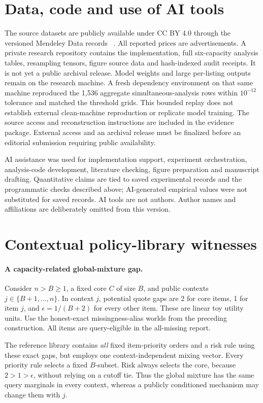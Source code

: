 \documentclass[11pt]{article}
\begin{document}
\section*{Data, code and use of AI tools}
The source datasets are publicly available under CC BY 4.0 through the
versioned Mendeley Data records ~\cite{jucarsdata,mucarsdata}. All reported
prices are advertisements. A private research repository contains the
implementation, full six-capacity analysis tables, resampling tensors, figure
source data and hash-indexed audit receipts. It is not yet a public archival
release. Model weights and large per-listing outputs remain on the research
machine. A fresh dependency environment on that same machine reproduced the 1,536 aggregate simultaneous-analysis rows within $10^{-12}$ tolerance and matched the threshold grids. This bounded replay does not establish external clean-machine reproduction or replicate model training.
The source access and reconstruction instructions are included in the evidence
package. External access and an archival release must be finalized before an
editorial submission requiring public availability.

AI assistance was used for implementation support, experiment orchestration,
analysis-code development, literature checking, figure preparation and manuscript
drafting. Quantitative claims are tied to saved experimental records and
the programmatic checks described above; AI-generated empirical values were not substituted for saved records. AI tools are not authors. Author names and affiliations are deliberately omitted from this version.

\appendix
\section{Contextual policy-library witnesses}\label{app:library}
\paragraph{A capacity-related global-mixture gap.}
Consider $n>B\ge1$, a fixed core $C$ of size $B$, and public contexts
$j\in\{B+1,\ldots,n\}$. In context $j$, potential quote gaps are 2 for core
items, 1 for item $j$, and $\epsilon=1/(B+2)$ for every other item. These are
linear toy utility units. Use the honest-exact missingness-alias worlds from
the preceding construction. All items are query-eligible in the all-missing report.

The reference library contains \emph{all} fixed item-priority orders and a risk
rule using these exact gaps, but employs one context-independent mixing vector.
Every priority rule selects a fixed $B$-subset. Risk always selects the core,
because $2>1>\epsilon$, without relying on a cutoff tie. Thus the global mixture
has the same query marginals in every context, whereas a publicly conditioned
mechanism may change them with $j$.
\end{document}
